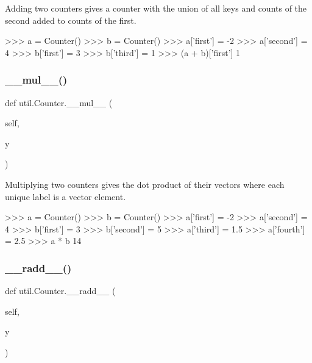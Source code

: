 \begin{DoxyVerb}Adding two counters gives a counter with the union of all keys and
counts of the second added to counts of the first.

>>> a = Counter()
>>> b = Counter()
>>> a['first'] = -2
>>> a['second'] = 4
>>> b['first'] = 3
>>> b['third'] = 1
>>> (a + b)['first']
1
\end{DoxyVerb}
 \mbox{\label{classutil_1_1_counter_a9f43e857acc90d489555652af32dcd1c}} 
\subsubsection{\texorpdfstring{\+\_\+\+\_\+mul\+\_\+\+\_\+()}{\_\_mul\_\_()}}
{\footnotesize\ttfamily def util.\+Counter.\+\_\+\+\_\+mul\+\_\+\+\_\+ (\begin{DoxyParamCaption}\item[{}]{self,  }\item[{}]{y }\end{DoxyParamCaption})}

\begin{DoxyVerb}Multiplying two counters gives the dot product of their vectors where
each unique label is a vector element.

>>> a = Counter()
>>> b = Counter()
>>> a['first'] = -2
>>> a['second'] = 4
>>> b['first'] = 3
>>> b['second'] = 5
>>> a['third'] = 1.5
>>> a['fourth'] = 2.5
>>> a * b
14
\end{DoxyVerb}
 \mbox{\label{classutil_1_1_counter_a4d15b474f84349a6d6b0694066b16ac2}} 
\subsubsection{\texorpdfstring{\+\_\+\+\_\+radd\+\_\+\+\_\+()}{\_\_radd\_\_()}}
{\footnotesize\ttfamily def util.\+Counter.\+\_\+\+\_\+radd\+\_\+\+\_\+ (\begin{DoxyParamCaption}\item[{}]{self,  }\item[{}]{y }\end{DoxyParamCaption})}

